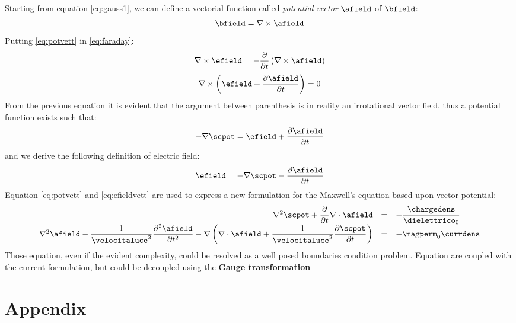 Starting from equation \ref{eq:gauss1}, we can define a vectorial function called \emph{potential vector} $\afield$ of $\bfield$:
\begin{equation}
\bfield = \nabla\times\afield
\label{eq:potvett}
\end{equation}
 Putting \ref{eq:potvett} in \ref{eq:faraday}:
\[
\nabla\times\efield = - \partialt \left( \nabla\times\afield \right)
\]
\begin{equation}
\nabla\times\left( \efield + \partialtarg{\afield} \right) = 0
\end{equation}
From the previous equation it is evident that the argument between parenthesis is in reality an irrotational vector field, thus a potential function exists such that:
\[
-\nabla\scpot = \efield + \partialtarg{\afield}
\]
and we derive the following definition of electric field:
\begin{equation}
\efield = - \nabla \scpot - \partialtarg{\afield}
\label{eq:efieldvett}
\end{equation}
Equation \ref{eq:potvett} and \ref{eq:efieldvett} are used to express a new formulation for the Maxwell's equation based upon vector potential:
\begin{equation}
\begin{array}{rcl}
\nabla^2\scpot + \partialt \nabla \cdot \afield & = & - \dfrac{\chargedens}{\dielettrico_0} \\
\nabla^2 \afield - \dfrac{1}{\velocitaluce^2} \partialttarg{\afield} - \nabla\left( \nabla \cdot \afield + \dfrac{1}{\velocitaluce^2} \partialtarg{\scpot} \right) & = & -\magperm_0 \currdens
\end{array}
\label{eq:potvecmaxwell}
\end{equation}
Those equation, even if the evident complexity, could be resolved as a well posed boundaries condition problem. Equation are coupled with the current formulation, but could be decoupled using the \textbf{Gauge transformation}




\section{Appendix}

